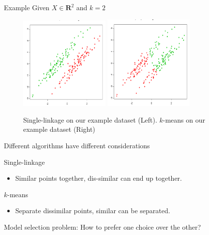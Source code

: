 \documentclass{beamer}
\newcommand{\mb}{\mathbf}
\begin{document}
\begin{frame}{Example}
	Given $X \in \mb R^2$ and $k = 2$
	\begin{center}
	\begin{figure}
	\includegraphics[trim={0 0 0 20},clip,width=0.4\textwidth]{figures/slX.png}
	\includegraphics[trim={0 0 0 20},clip,width=0.4\textwidth]{figures/kmeansX.png}
	\caption{Single-linkage on our example dataset (Left). $k$-means on our example dataset (Right)}
	\end{figure}
	\end{center}
\end{frame}

\begin{frame}{Different algorithms have different considerations}
	
	Single-linkage\\
	\begin{itemize}
		\item Similar points together, dis-similar can end up together.
	\end{itemize}
	
	\vspace{10pt}$k$-means\\
	\begin{itemize}
		\item Separate dissimilar points, similar can be separated. 
	\end{itemize}
	
	 \vspace{20pt}\alert{Model selection problem:} How to prefer one choice over the other?
\end{frame}
\end{document}
